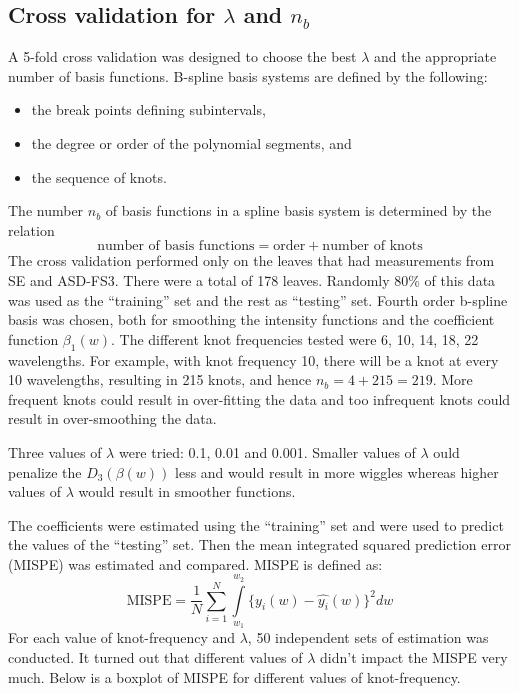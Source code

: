 \subsection*{Cross validation for $\lambda$ and $n_b$}
A 5-fold cross validation was designed to choose the best $\lambda$ and the appropriate number of basis functions. B-spline basis systems are defined by the following:
\begin{itemize}
\item the break points defining subintervals,
\item the degree or order of the polynomial segments, and
\item the sequence of knots.
\end{itemize}
The number $n_b$ of basis functions in a spline basis system is determined by the relation
\[ \text{number of basis functions} = \text{order} + \text{number of knots} \]
The cross validation performed only on the leaves that had measurements from SE and ASD-FS3. There were a total of 178 leaves. Randomly 80\% of this data was used as the ``training'' set and the rest as ``testing'' set. Fourth order b-spline basis was chosen, both for smoothing the intensity functions and the coefficient function $\beta_1(w)$. The different knot frequencies tested were 6, 10, 14, 18, 22 wavelengths. For example, with knot frequency 10, there will be a knot at every 10 wavelengths, resulting in 215 knots, and hence $n_b = 4 + 215 = 219$. More frequent knots could result in over-fitting the data and too infrequent knots could result in over-smoothing the data.

Three values of $\lambda$ were tried: 0.1, 0.01 and 0.001. Smaller values of $\lambda$ ould penalize the $D_3(\beta(w))$ less and would result in more wiggles whereas higher values of $\lambda$ would result in smoother functions.

The coefficients were estimated using the ``training'' set and were used to predict the values of the ``testing'' set. Then the mean integrated squared prediction error (MISPE) was estimated and compared. MISPE is defined as:
\begin{equation}
\text{MISPE} = \frac{1}{N} \sum \limits_{i = 1} ^{N} \int\limits_{w_1}^{w_2} \{y_i(w) - \hat{y_i}(w)\}^2dw
\end{equation}
For each value of knot-frequency and $\lambda$, 50 independent sets of estimation was conducted. It turned out that different values of $\lambda$ didn't impact the MISPE very much. Below is a boxplot of MISPE for different values of knot-frequency. 

